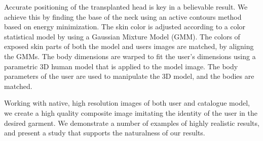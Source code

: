 
Accurate positioning of the transplanted head is key in a believable result. We achieve this by finding the base of the neck using an active contours method based on energy minimization. The skin color is adjusted according to a color statistical model by using a Gaussian Mixture Model (GMM). The colors of exposed skin parts of both the model and users images are matched, by aligning the GMMs. The body dimensions are warped to fit the user's dimensions using a parametric 3D human model that is applied to the model image. The body parameters of the user are used to manipulate the 3D model, and the bodies are matched.


Working with native, high resolution images of both user and catalogue model, we create a high quality composite image imitating the identity of the user in the desired garment. We demonstrate a number of examples of highly realistic results, and present a study that supports the naturalness of our results.

